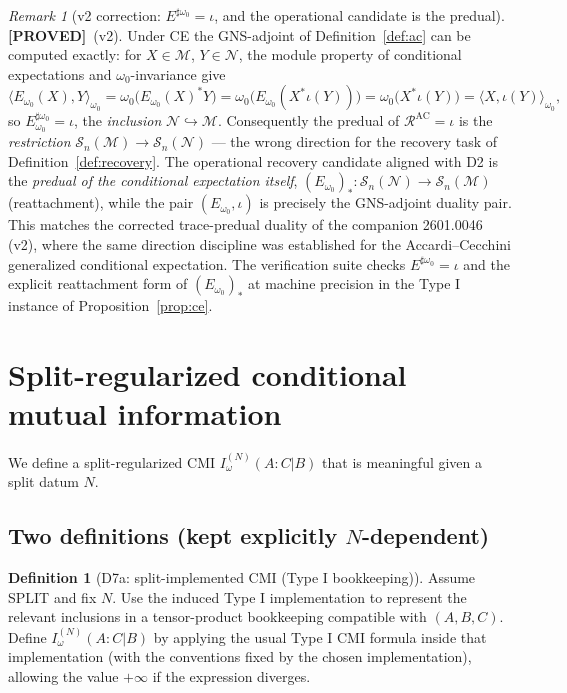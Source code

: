 \documentclass[11pt]{article}
\theoremstyle{definition}
\newtheorem{definition}[theorem]{Definition}
\theoremstyle{remark}
\newtheorem{remark}[theorem]{Remark}
\newcommand{\PROVED}{\textcolor{green!60!black}{\textbf{[PROVED]}}}
\newcommand{\cN}{\mathcal{N}}
\newcommand{\cM}{\mathcal{M}}
\newcommand{\cR}{\mathcal{R}}
\newcommand{\Sn}{\mathcal{S}_n}
\begin{document}
\begin{remark}[v2 correction: $E^{\sharp\omega_0} = \iota$, and the
operational candidate is the predual]
\label{rem:direction}
\PROVED\ (v2). Under CE the GNS-adjoint of Definition~\ref{def:ac} can
be computed exactly: for $X \in \cM$, $Y \in \cN$, the module property
of conditional expectations and $\omega_0$-invariance give
\[
\langle E_{\omega_0}(X), Y\rangle_{\omega_0}
= \omega_0\bigl(E_{\omega_0}(X)^* Y\bigr)
= \omega_0\bigl(E_{\omega_0}(X^* \iota(Y))\bigr)
= \omega_0\bigl(X^* \iota(Y)\bigr)
= \langle X, \iota(Y)\rangle_{\omega_0},
\]
so $E_{\omega_0}^{\sharp\omega_0} = \iota$, the \emph{inclusion} $\cN
\hookrightarrow \cM$. Consequently the predual of
$\cR^{\mathrm{AC}} = \iota$ is the \emph{restriction} $\Sn(\cM) \to
\Sn(\cN)$ --- the wrong direction for the recovery task of
Definition~\ref{def:recovery}. The operational recovery candidate
aligned with D2 is the \emph{predual of the conditional expectation
itself}, $(E_{\omega_0})_*: \Sn(\cN) \to \Sn(\cM)$ (reattachment), while
the pair $(E_{\omega_0}, \iota)$ is precisely the GNS-adjoint duality
pair. This matches the corrected trace-predual duality of the companion
2601.0046 (v2), where the same direction discipline was established for
the Accardi--Cecchini generalized conditional expectation. The
verification suite checks $E^{\sharp\omega_0} = \iota$ and the explicit
reattachment form of $(E_{\omega_0})_*$ at machine precision in the Type
I instance of Proposition~\ref{prop:ce}.
\end{remark}

\section{Split-regularized conditional mutual information}

We define a split-regularized CMI $I^{(N)}_\omega(A : C | B)$ that is
meaningful given a split datum $N$.

\subsection{Two definitions (kept explicitly $N$-dependent)}

\begin{definition}[D7a: split-implemented CMI (Type I bookkeeping)]
\label{def:cmia}
Assume SPLIT and fix $N$. Use the induced Type I implementation to
represent the relevant inclusions in a tensor-product bookkeeping
compatible with $(A, B, C)$. Define $I^{(N)}_\omega(A : C | B)$ by
applying the usual Type I CMI formula inside that implementation (with
the conventions fixed by the chosen implementation), allowing the value
$+\infty$ if the expression diverges.
\end{definition}
\end{document}
